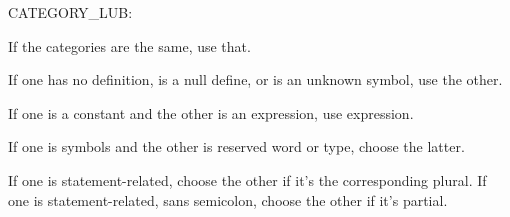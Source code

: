 CATEGORY_LUB:

If the categories are the same, use that.

If one has no definition, is a null define, or is an unknown symbol, use
the other.

If one is a constant and the other is an expression, use expression.

If one is symbols and the other is reserved word or type, choose the latter.

If one is statement-related, choose the other if it's the corresponding plural.
If one is statement-related, sans semicolon, choose the other if it's partial.

